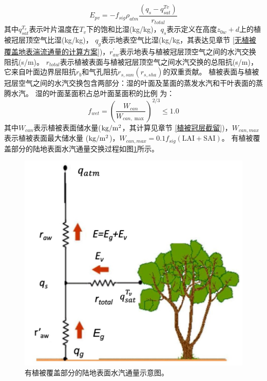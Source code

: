 \begin{equation}
E_{pv}=-f_{sig} \rho_{atm} \frac{\left(q_{s}-q_{s a t}^{T v}\right)}{r_{t o t a l}}
\end{equation}
其中$q_{sat}^{T_v}$表示叶片温度在$T_v$下的饱和比湿(kg/kg)，$q_s$表示定义在高度$z_{0w}+d$上的植被冠层顶空气比湿(kg/kg)，
$q_g$表示地表空气比湿(kg/kg，其表达见章节 \ref{无植被覆盖地表湍流通量的计算方案})，$r_{aw}^\prime$表示地表与植被冠层顶空气之间的水汽交换阻抗(s/m)。
$r_{total}$表示植被表面与植被冠层顶空气之间水汽交换的总阻抗(s/m)，
它来自叶面边界层阻抗$r_b$和气孔阻抗$r_{s,sun}\left(r_{s,sha}\right)$的双重贡献。
植被表面与植被冠层空气之间的水汽交换包含两部分：湿的叶面及茎面的蒸发水汽和干叶表面的蒸腾水汽。
湿的叶面茎面积占总叶面茎面积的比例 \citep{dickinson1993biosphere} 为：
\begin{equation}
f_{w e t}=\left(\frac{W_{c a n}}{W_{c a n, \max }}\right)^{2 / 3} \leq 1.0
\end{equation}
其中$W_{can}$表示植被表面储水量($\rm kg/m^2$，其计算见章节 \ref{植被冠层截留})，$W_{can,max}$表示植被表面最大储水量
($\rm kg/m^2$)，$W_{can,max}=0.1f_{sig}\left(\text {LAI}+ \text {SAI}\right)$。
有植被覆盖部分的陆地表面水汽通量交换过程如图\ref{fig:有植被覆盖部分的陆地表面水汽通量示意图}所示。
{
\begin{figure}[]
\centering
\includegraphics{Figures/地表湍流交换过程/有植被覆盖部分的陆地表面水汽通量示意图.png}
\caption{有植被覆盖部分的陆地表面水汽通量示意图。}
\label{fig:有植被覆盖部分的陆地表面水汽通量示意图}
\end{figure}
}

